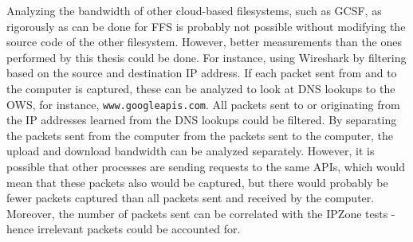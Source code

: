 Analyzing the bandwidth of other \mbox{cloud-based} filesystems, such as \gls{GCSF}, as rigorously as can be done for \gls{FFS} is probably not possible without modifying the source code of the other filesystem. However, better measurements than the ones performed by this thesis could be done. For instance, using Wireshark by filtering based on the source and destination IP address. If each packet sent from and to the computer is captured, these can be analyzed to look at DNS lookups to the \gls{OWS}, for instance, \texttt{www.googleapis.com}. All packets sent to or originating from the IP addresses learned from the DNS lookups could be filtered. By separating the packets sent from the computer from the packets sent to the computer, the upload and download bandwidth can be analyzed separately. However, it is possible that other processes are sending requests to the same \glspl{API}, which would mean that these packets also would be captured, but there would probably be fewer packets captured than all packets sent and received by the computer. Moreover, the number of packets sent can be correlated with the IPZone tests - hence irrelevant packets could be accounted for. 

%
%
%
%
%
%
%
%
%

